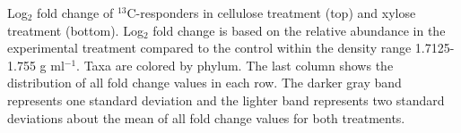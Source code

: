 Log$_{2}$ fold change of $^{13}$C-responders in cellulose
treatment (top) and xylose treatment (bottom).  Log$_{2}$ fold change is based
on the relative abundance in the experimental treatment compared to the control
within the density range 1.7125-1.755 g ml$^{-1}$. Taxa are
colored by phylum. The last column shows the distribution of all fold change values in each row. The darker gray band represents one standard deviation and the lighter band represents two standard deviations about the mean of all fold change values for both treatments.  

    
    
